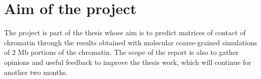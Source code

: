 \section{Aim of the project} \label{chap: aim}

The project is part of the thesis whose aim is to predict matrices of contact of chromatin through the results obtained with molecular coarse-grained simulations of 2 Mb portions of the chromatin.
The scope of the report is also to gather opinions and useful feedback to improve the thesis work, which will continue for another two months.
